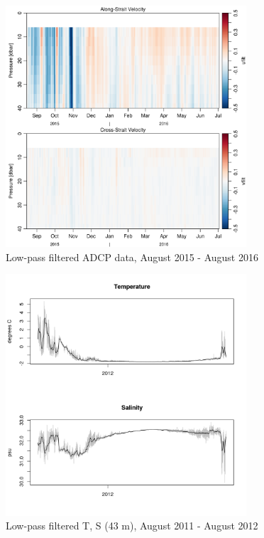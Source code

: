 \documentclass[12pt]{dforeport}
\begin{document}
\begin{figure}  
\centering
\includegraphics[width = 0.8\textwidth]{./figures/18_madcp_lpf_2015_2016.png}
\caption[Low-pass filtered ADCP data, 2015-2016]{Low-pass filtered ADCP data, August 2015 - August 2016}
\label{f:madcp_lpf_2015_2016}
\end{figure}



\begin{figure}  
\centering
\includegraphics[width = 0.8\textwidth]{./figures/19_lpf_TS_43m_2011_2012.png}
\caption[Low-pass filtered T, S (43 m), 2011-2012]{Low-pass filtered T, S (43 m), August 2011 - August 2012}
\label{f:ctd_43_lpf_2011_2012}
\end{figure}
\end{document}
